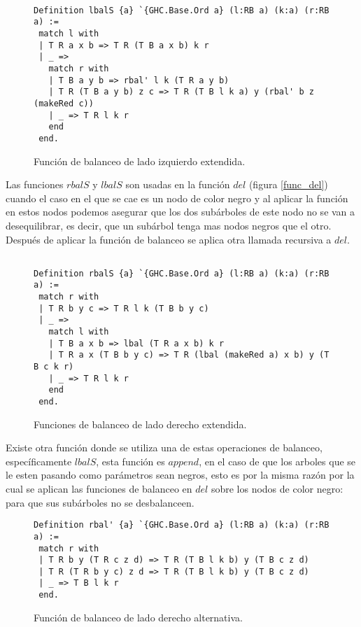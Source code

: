 \begin{figure}
\centering
\captionsetup{justification=centering}
\begin{verbatim}

Definition lbalS {a} `{GHC.Base.Ord a} (l:RB a) (k:a) (r:RB a) :=
 match l with
 | T R a x b => T R (T B a x b) k r
 | _ =>
   match r with
   | T B a y b => rbal' l k (T R a y b)
   | T R (T B a y b) z c => T R (T B l k a) y (rbal' b z (makeRed c))
   | _ => T R l k r
   end
 end.

\end{verbatim}
\caption{Funci\'on de balanceo de lado izquierdo extendida.}
\label{lbalS}
\end{figure}

Las funciones $rbalS$ y $lbalS$ son usadas en la funci\'on $del$ (figura \ref{func_del}) cuando el
caso en el que se cae es un nodo de color negro y al aplicar la funci\'on en estos nodos podemos
asegurar que los dos subárboles de este nodo no se van a desequilibrar, es decir, que un subárbol
tenga mas nodos negros que el otro. Después de aplicar la función de balanceo se aplica otra llamada
recursiva a $del$.


\begin{figure}
\centering
\captionsetup{justification=centering}
\begin{verbatim}

Definition rbalS {a} `{GHC.Base.Ord a} (l:RB a) (k:a) (r:RB a) :=
 match r with
 | T R b y c => T R l k (T B b y c)
 | _ =>
   match l with
   | T B a x b => lbal (T R a x b) k r
   | T R a x (T B b y c) => T R (lbal (makeRed a) x b) y (T B c k r)
   | _ => T R l k r
   end
 end.

\end{verbatim}
\caption{Funciones de balanceo de lado derecho extendida.}
\label{rbalS}
\end{figure}

Existe otra función donde se utiliza una de estas operaciones de balanceo, específicamente $lbalS$,
esta funci\'on es $append$, en el caso de que los arboles que se le esten pasando como parámetros
sean negros, esto es por la misma razón por la cual se aplican las funciones de balanceo en $del$
sobre los nodos de color negro: para que sus subárboles no se desbalanceen.

\begin{figure}
\centering
\captionsetup{justification=centering}
\begin{verbatim}
Definition rbal' {a} `{GHC.Base.Ord a} (l:RB a) (k:a) (r:RB a) :=
 match r with
 | T R b y (T R c z d) => T R (T B l k b) y (T B c z d)
 | T R (T R b y c) z d => T R (T B l k b) y (T B c z d)
 | _ => T B l k r
 end.

\end{verbatim}
\caption{Funci\'on de balanceo de lado derecho alternativa.}
\label{rbal_2}
\end{figure}

